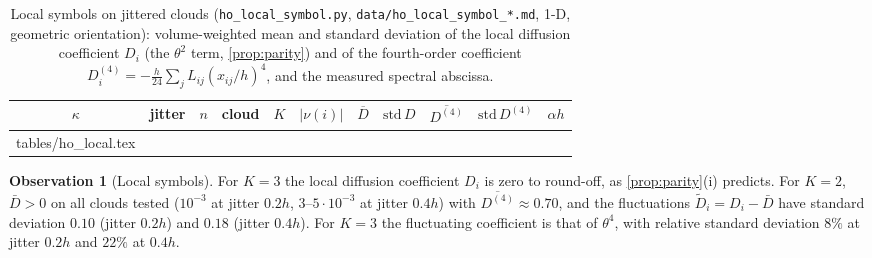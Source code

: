 \documentclass[11pt,a4paper]{article}
\makeatletter
\theoremstyle{plain}
\theoremstyle{definition}
\newtheorem{observation}[theorem]{Observation}
\theoremstyle{remark}
\numberwithin{equation}{section}
\newcommand{\nb}{\nu}
\newcommand{\inputrows}[1]{\@@input #1 }%
\makeatother
\begin{document}
\begin{table}[t]
\centering
\caption{Local symbols on jittered clouds (\texttt{ho\_local\_symbol.py}, \texttt{data/ho\_local\_symbol\_*.md}, 1-D, geometric orientation): volume-weighted mean and standard deviation of the local diffusion coefficient $D_i$ (the $\theta^2$ term, \cref{prop:parity}) and of the fourth-order coefficient $D^{(4)}_i=-\frac h{24}\sum_jL_{ij}(x_{ij}/h)^4$, and the measured spectral abscissa.}\label{tab:local}
\small
\begin{tabular}{ccccccccccc}
\toprule
$\kappa$ & jitter & $n$ & cloud & $K$ & $|\nb(i)|$ & $\overline{D}$ & $\mathrm{std}\,D$ & $\overline{D^{(4)}}$ & $\mathrm{std}\,D^{(4)}$ & $\alpha h$\\
\midrule
\inputrows{tables/ho_local.tex}
\bottomrule
\end{tabular}
\end{table}

\begin{observation}[Local symbols]\label{obs:local}
For $K=3$ the local diffusion coefficient $D_i$ is zero to round-off, as \cref{prop:parity}(i) predicts. For $K=2$, $\bar D>0$ on all clouds tested ($10^{-3}$ at jitter $0.2h$, $3$--$5\cdot10^{-3}$ at jitter $0.4h$) with $\overline{D^{(4)}}\approx0.70$, and the fluctuations $\tilde D_i=D_i-\bar D$ have standard deviation $0.10$ (jitter $0.2h$) and $0.18$ (jitter $0.4h$). For $K=3$ the fluctuating coefficient is that of $\theta^{4}$, with relative standard deviation $8\%$ at jitter $0.2h$ and $22\%$ at $0.4h$.
\end{observation}
\end{document}
